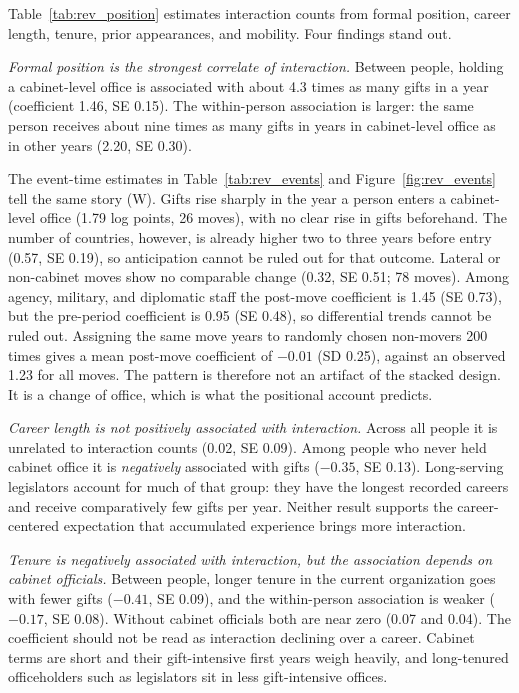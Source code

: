 \documentclass[11pt]{article}
\begin{document}
Table~\ref{tab:rev_position} estimates interaction counts from formal position, career length, tenure, prior appearances, and mobility. Four findings stand out.

\emph{Formal position is the strongest correlate of interaction.} Between people, holding a cabinet-level office is associated with about 4.3 times as many gifts in a year (coefficient 1.46, SE 0.15). The within-person association is larger: the same person receives about nine times as many gifts in years in cabinet-level office as in other years (2.20, SE 0.30).

The event-time estimates in Table~\ref{tab:rev_events} and Figure~\ref{fig:rev_events} tell the same story (W). Gifts rise sharply in the year a person enters a cabinet-level office (1.79 log points, 26 moves), with no clear rise in gifts beforehand. The number of countries, however, is already higher two to three years before entry (0.57, SE 0.19), so anticipation cannot be ruled out for that outcome. Lateral or non-cabinet moves show no comparable change (0.32, SE 0.51; 78 moves). Among agency, military, and diplomatic staff the post-move coefficient is 1.45 (SE 0.73), but the pre-period coefficient is 0.95 (SE 0.48), so differential trends cannot be ruled out. Assigning the same move years to randomly chosen non-movers 200 times gives a mean post-move coefficient of $-0.01$ (SD 0.25), against an observed 1.23 for all moves. The pattern is therefore not an artifact of the stacked design. It is a change of office, which is what the positional account predicts.

\emph{Career length is not positively associated with interaction.} Across all people it is unrelated to interaction counts (0.02, SE 0.09). Among people who never held cabinet office it is \emph{negatively} associated with gifts ($-0.35$, SE 0.13). Long-serving legislators account for much of that group: they have the longest recorded careers and receive comparatively few gifts per year. Neither result supports the career-centered expectation that accumulated experience brings more interaction.

\emph{Tenure is negatively associated with interaction, but the association depends on cabinet officials.} Between people, longer tenure in the current organization goes with fewer gifts ($-0.41$, SE 0.09), and the within-person association is weaker ($-0.17$, SE 0.08). Without cabinet officials both are near zero (0.07 and 0.04). The coefficient should not be read as interaction declining over a career. Cabinet terms are short and their gift-intensive first years weigh heavily, and long-tenured officeholders such as legislators sit in less gift-intensive offices.
\end{document}
